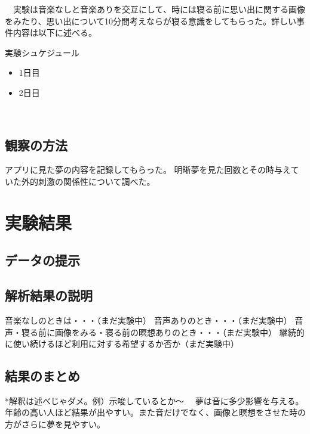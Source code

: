 　実験は音楽なしと音楽ありを交互にして、時には寝る前に思い出に関する画像をみたり、思い出について10分間考えならが寝る意識をしてもらった。詳しい事件内容は以下に述べる。

実験シュケジュール

\begin{itemize}
\item 1日目
\item 2日目
\end{itemize}
　
\subsection{観察の方法}
アプリに見た夢の内容を記録してもらった。
明晰夢を見た回数とその時与えていた外的刺激の関係性について調べた。

\section{実験結果}
\subsection{データの提示}

\subsection{解析結果の説明}
音楽なしのときは・・・（まだ実験中）
音声ありのとき・・・（まだ実験中）
音声・寝る前に画像をみる・寝る前の瞑想ありのとき・・・（まだ実験中）
継続的に使い続けるほど利用に対する希望するか否か（まだ実験中）

\subsection{結果のまとめ}
 *解釈は述べじゃダメ。例）示唆しているとか〜
　夢は音に多少影響を与える。年齢の高い人ほど結果が出やすい。また音だけでなく、画像と瞑想をさせた時の方がさらに夢を見やすい。